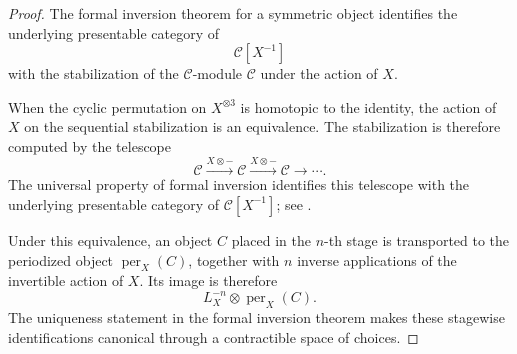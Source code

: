 \begin{proof}
The formal inversion theorem for a symmetric object identifies the
underlying presentable category of
\[
    \mathcal C[X^{-1}]
\]
with the stabilization of the \(\mathcal C\)-module \(\mathcal C\) under
the action of \(X\).

When the cyclic permutation on \(X^{\otimes3}\) is homotopic to the
identity, the action of \(X\) on the sequential stabilization is an
equivalence.  The stabilization is therefore computed by the telescope
\[
    \mathcal C
    \xrightarrow{X\otimes-}
    \mathcal C
    \xrightarrow{X\otimes-}
    \mathcal C
    \longrightarrow\cdots.
\]
The universal property of formal inversion identifies this telescope with
the underlying presentable category of
\(\mathcal C[X^{-1}]\); see
\cite[Proposition~2.19 and Corollary~2.22]
{RobaloNoncommutativeMotivesI}.

Under this equivalence, an object \(C\) placed in the \(n\)-th stage is
transported to the periodized object
\(\operatorname{per}_X(C)\), together with \(n\) inverse applications of
the invertible action of \(X\).  Its image is therefore
\[
    L_X^{-n}
    \otimes
    \operatorname{per}_X(C).
\]
The uniqueness statement in the formal inversion theorem makes these
stagewise identifications canonical through a contractible space of
choices.
\end{proof}


